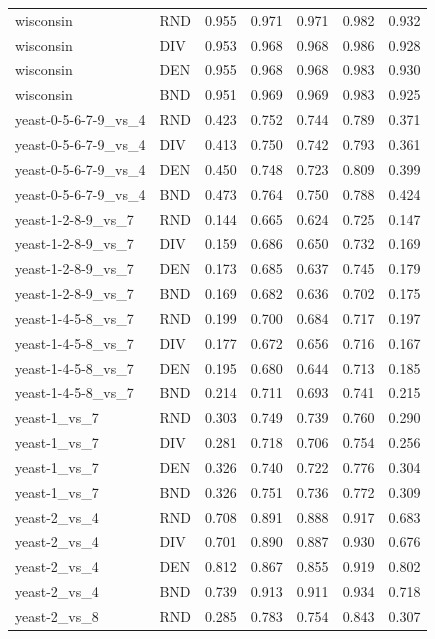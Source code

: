 \documentclass[10pt,a4paper]{article}
\begin{document}
\begin{longtable}{lllllrr}
wisconsin & RND & 0.955 & 0.971 & 0.971 & 0.982 & 0.932 \\
wisconsin & DIV & 0.953 & 0.968 & 0.968 & 0.986 & 0.928 \\
wisconsin & DEN & 0.955 & 0.968 & 0.968 & 0.983 & 0.930 \\
wisconsin & BND & 0.951 & 0.969 & 0.969 & 0.983 & 0.925 \\
yeast-0-5-6-7-9\_vs\_4 & RND & 0.423 & 0.752 & 0.744 & 0.789 & 0.371 \\
yeast-0-5-6-7-9\_vs\_4 & DIV & 0.413 & 0.750 & 0.742 & 0.793 & 0.361 \\
yeast-0-5-6-7-9\_vs\_4 & DEN & 0.450 & 0.748 & 0.723 & 0.809 & 0.399 \\
yeast-0-5-6-7-9\_vs\_4 & BND & 0.473 & 0.764 & 0.750 & 0.788 & 0.424 \\
yeast-1-2-8-9\_vs\_7 & RND & 0.144 & 0.665 & 0.624 & 0.725 & 0.147 \\
yeast-1-2-8-9\_vs\_7 & DIV & 0.159 & 0.686 & 0.650 & 0.732 & 0.169 \\
yeast-1-2-8-9\_vs\_7 & DEN & 0.173 & 0.685 & 0.637 & 0.745 & 0.179 \\
yeast-1-2-8-9\_vs\_7 & BND & 0.169 & 0.682 & 0.636 & 0.702 & 0.175 \\
yeast-1-4-5-8\_vs\_7 & RND & 0.199 & 0.700 & 0.684 & 0.717 & 0.197 \\
yeast-1-4-5-8\_vs\_7 & DIV & 0.177 & 0.672 & 0.656 & 0.716 & 0.167 \\
yeast-1-4-5-8\_vs\_7 & DEN & 0.195 & 0.680 & 0.644 & 0.713 & 0.185 \\
yeast-1-4-5-8\_vs\_7 & BND & 0.214 & 0.711 & 0.693 & 0.741 & 0.215 \\
yeast-1\_vs\_7 & RND & 0.303 & 0.749 & 0.739 & 0.760 & 0.290 \\
yeast-1\_vs\_7 & DIV & 0.281 & 0.718 & 0.706 & 0.754 & 0.256 \\
yeast-1\_vs\_7 & DEN & 0.326 & 0.740 & 0.722 & 0.776 & 0.304 \\
yeast-1\_vs\_7 & BND & 0.326 & 0.751 & 0.736 & 0.772 & 0.309 \\
yeast-2\_vs\_4 & RND & 0.708 & 0.891 & 0.888 & 0.917 & 0.683 \\
yeast-2\_vs\_4 & DIV & 0.701 & 0.890 & 0.887 & 0.930 & 0.676 \\
yeast-2\_vs\_4 & DEN & 0.812 & 0.867 & 0.855 & 0.919 & 0.802 \\
yeast-2\_vs\_4 & BND & 0.739 & 0.913 & 0.911 & 0.934 & 0.718 \\
yeast-2\_vs\_8 & RND & 0.285 & 0.783 & 0.754 & 0.843 & 0.307 \\

\end{longtable}
\end{document}
